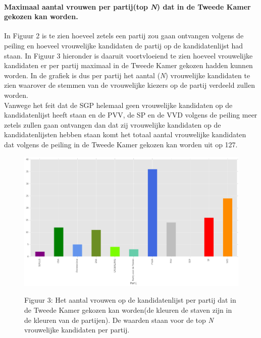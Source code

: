 \paragraph{Maximaal aantal vrouwen per partij(top \textit{N}) dat in de Tweede Kamer gekozen kan worden.}
In Figuur 2 is te zien hoeveel zetels een partij zou gaan ontvangen volgens de peiling en hoeveel vrouwelijke kandidaten de partij op de kandidatenlijst had staan. In Figuur 3 hieronder is daaruit voortvloeiend te zien hoeveel vrouwelijke kandidaten er per partij maximaal in de Tweede Kamer gekozen hadden kunnen worden. In de grafiek is dus per partij het aantal (\textit{N}) vrouwelijke kandidaten te zien waarover de stemmen van de vrouwelijke kiezers op de partij verdeeld zullen worden.  
\\
Vanwege het feit dat de SGP helemaal geen vrouwelijke kandidaten op de kandidatenlijst heeft staan en de PVV, de SP en de VVD volgens de peiling meer zetels zullen gaan ontvangen dan dat zij vrouwelijke kandidaten op de kandidatenlijsten hebben staan komt het totaal aantal vrouwelijke kandidaten dat volgens de peiling in de Tweede Kamer gekozen kan worden uit op 127. 

\begin{figure}[H]
\begin{center}
	\includegraphics[width=\linewidth]	{aantal_vrouwen_per_partij_in_tweede_kamer_volgens_peiling.png}
		\begin{center}
			Figuur 3: Het aantal vrouwen op de kandidatenlijst per partij dat in de Tweede Kamer gekozen kan worden(de kleuren de staven zijn in de kleuren van de partijen). De waarden staan voor de top \textit{N} vrouwelijke kandidaten per partij.   
		\end{center}
\end{center}
\end{figure}

